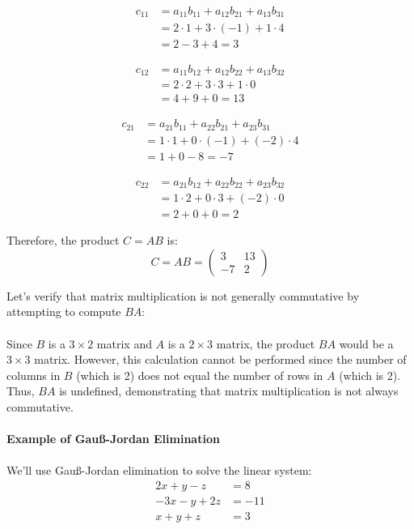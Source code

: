 \begin{align*}
c_{11} &= a_{11}b_{11} + a_{12}b_{21} + a_{13}b_{31} \\
&= 2 \cdot 1 + 3 \cdot (-1) + 1 \cdot 4 \\
&= 2 - 3 + 4 = 3
\end{align*}

\begin{align*}
c_{12} &= a_{11}b_{12} + a_{12}b_{22} + a_{13}b_{32} \\
&= 2 \cdot 2 + 3 \cdot 3 + 1 \cdot 0 \\
&= 4 + 9 + 0 = 13
\end{align*}

\begin{align*}
c_{21} &= a_{21}b_{11} + a_{22}b_{21} + a_{23}b_{31} \\
&= 1 \cdot 1 + 0 \cdot (-1) + (-2) \cdot 4 \\
&= 1 + 0 - 8 = -7
\end{align*}

\begin{align*}
c_{22} &= a_{21}b_{12} + a_{22}b_{22} + a_{23}b_{32} \\
&= 1 \cdot 2 + 0 \cdot 3 + (-2) \cdot 0 \\
&= 2 + 0 + 0 = 2
\end{align*}

Therefore, the product \(C = AB\) is:
\begin{equation*}
C = AB = 
\begin{pmatrix}
3 & 13 \\
-7 & 2
\end{pmatrix}
\end{equation*}

Let's verify that matrix multiplication is not generally commutative by attempting to compute \(BA\):
\\\\
Since \(B\) is a \(3 \times 2\) matrix and \(A\) is a \(2 \times 3\) matrix, the product \(BA\) would be a \(3 \times 3\) matrix. However, this calculation cannot be performed since the number of columns in \(B\) (which is 2) does not equal the number of rows in \(A\) (which is 2). Thus, \(BA\) is undefined, demonstrating that matrix multiplication is not always commutative.
\\\\
\textbf{Example of Gauß-Jordan Elimination}
\\\\
We'll use Gauß-Jordan elimination to solve the linear system:
\begin{align*}
2x + y - z &= 8 \\
-3x - y + 2z &= -11 \\
x + y + z &= 3
\end{align*}

